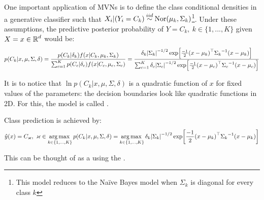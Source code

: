 One important application of MVNs is to define the class conditional densities in a generative classifier such that $X_i|(Y_i=C_k)\dist{iid}\text{Nor}(\mu_k,\Sigma_k)$\footnote{This model reduces to the Naïve Bayes model when $\Sigma_k$ is diagonal for every class $k$}. Under these assumptions, the predictive posterior probability of $Y=C_k,\ k\in\{1,...,K\}$ given $X=x\in\operatorname{\mathbb{R}}^d$ would be:
\begin{equation*}
    p(C_k|x,\mu,\Sigma,\delta) = \frac{p(C_k|\delta_k)f(x|C_k,\mu_k,\Sigma_k)}{\sum_{c=1}^K p(C_c|\delta_c)f(x|C_c,\mu_c,\Sigma_c)} = \frac{\delta_k\abs{\Sigma_k}^{-1/2} \exp[\frac{-1}{2}{(x-\mu_k)}^\top{\Sigma_k}^{-1}(x-\mu_k)]}{\sum_{c=1}^K \delta_c\abs{\Sigma_c}^{-1/2} \exp[\frac{-1}{2}{(x-\mu_c)}^\top{\Sigma_c}^{-1}(x-\mu_c)]}
\end{equation*}

It is to notice that $\ln p(C_k|x,\mu,\Sigma,\delta)$ is a quadratic function of $x$ for fixed values of the parameters: the decision boundaries look like quadratic functions in 2D. For this, the model is called .

Class prediction is achieved by:
\begin{equation*}
    \hat{y}(x) = C_{\varkappa},\ \varkappa \in \operatorname*{arg\,max\,}_{k\in \{1,\dots,K\}} p(C_k|x,\mu,\Sigma,\delta) = \operatorname*{arg\,max\,}_{k\in \{1,\dots,K\}} \delta_k\abs{\Sigma_k}^{-1/2} \exp[\frac{-1}{2}{(x-\mu_k)}^\top{\Sigma_k}^{-1}(x-\mu_k)]
\end{equation*}

This can be thought of as a  using the .